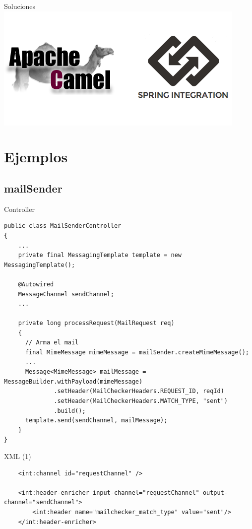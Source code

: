 \documentclass{beamer}
\begin{document}
\begin{frame}{Soluciones}
\includegraphics[width= 0.9\linewidth]{camel-spring}
\end{frame}

\section{Ejemplos}
\subsection{mailSender}
\begin{frame}[fragile]{Controller}
\lstset{language=Java, basicstyle=\tiny, stringstyle=\bfseries}
\begin{lstlisting}
public class MailSenderController
{
    ...
    private final MessagingTemplate template = new MessagingTemplate();

    @Autowired
    MessageChannel sendChannel;
    ...
    
    private long processRequest(MailRequest req)
    {
      // Arma el mail
      final MimeMessage mimeMessage = mailSender.createMimeMessage();
      ...
      Message<MimeMessage> mailMessage = MessageBuilder.withPayload(mimeMessage)
              .setHeader(MailCheckerHeaders.REQUEST_ID, reqId)
              .setHeader(MailCheckerHeaders.MATCH_TYPE, "sent")
              .build();
      template.send(sendChannel, mailMessage);      
    }
}
\end{lstlisting}
\end{frame}

\begin{frame}[fragile]{XML (1)}
\lstset{language=XML,  basicstyle=\tiny, stringstyle=\bfseries}
\begin{lstlisting}
    <int:channel id="requestChannel" />

    <int:header-enricher input-channel="requestChannel" output-channel="sendChannel">
        <int:header name="mailchecker_match_type" value="sent"/>
    </int:header-enricher>
\end{lstlisting}
\end{frame}
\end{document}
